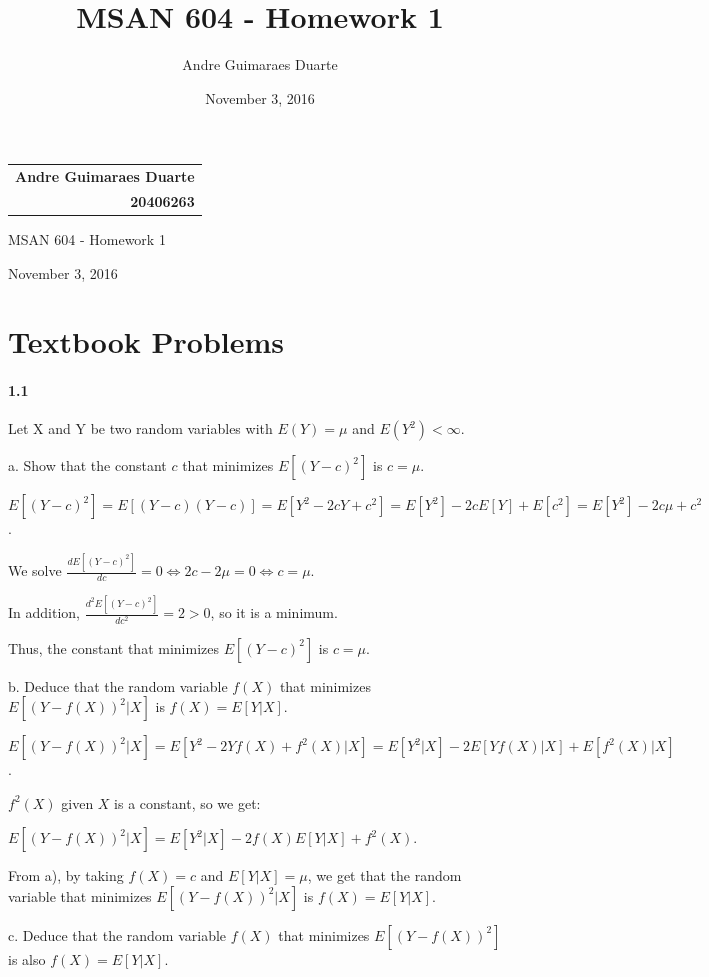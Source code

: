 \documentclass[]{article}
\title{MSAN 604 - Homework 1}
\author{Andre Guimaraes Duarte}
\date{November 3, 2016}
\let\oldparagraph\paragraph
\renewcommand{\paragraph}[1]{\oldparagraph{#1}\mbox{}}
\begin{document}
\null\hfill\begin{tabular}[t]{r@{}}
  \textbf{\LARGE Andre Guimaraes Duarte} \\
  \textbf{\Large 20406263}
\end{tabular}

\begin{center}
\Huge
MSAN 604 - Homework 1

\Large
November 3, 2016

\normalsize
\end{center}

\section{Textbook Problems}
\paragraph{1.1}
Let X and Y be two random variables with $E(Y) = \mu$ and $E(Y^2) < \infty$.

a. Show that the constant $c$ that minimizes $E[(Y - c)^2]$ is $c = \mu$.

\color{blue}
$E[(Y-c)^2] = E[(Y-c)(Y-c)]
            = E[Y^2 - 2cY + c^2]
            = E[Y^2] - 2cE[Y] + E[c^2]
            = E[Y^2] - 2c\mu + c^2$.

We solve $\frac{d E[(Y-c)^2]}{d c} = 0 \Leftrightarrow 2c - 2\mu = 0 \Leftrightarrow c = \mu$.

In addition, $\frac{d^2 E[(Y-c)^2]}{d c^2} = 2 > 0$, so it is a minimum.

Thus, the constant that minimizes $E[(Y - c)^2]$ is $c = \mu$.
\color{black}

b. Deduce that the random variable $f(X)$ that minimizes $E[(Y - f(X))^2|X]$ is $f(X) = E[Y|X]$.

\color{blue}
$E[(Y - f(X))^2|X] = E[Y^2 - 2Yf(X) + f^2(X)|X]
                   = E[Y^2|X] - 2E[Yf(X)|X] + E[f^2(X)|X]$.

$f^2(X)$ given $X$ is a constant, so we get:

$E[(Y - f(X))^2|X] = E[Y^2|X] - 2f(X)E[Y|X] + f^2(X)$.

From a), by taking $f(X) = c$ and $E[Y|X] = \mu$, we get that the random variable that minimizes $E[(Y - f(X))^2|X]$ is $f(X) = E[Y|X]$.
\color{black}

c. Deduce that the random variable $f(X)$ that minimizes $E[(Y - f(X))^2]$ is also $f(X) = E[Y|X]$.
\end{document}
